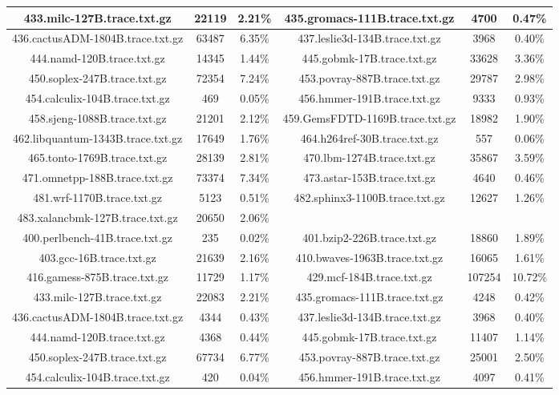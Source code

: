 \begin{table}[H]
\begin{tabular}{|c|c|c|c|c|c|}
433.milc-127B.trace.txt.gz & 22119 & 2.21\% & 435.gromacs-111B.trace.txt.gz & 4700 & 0.47\% \\\hline
436.cactusADM-1804B.trace.txt.gz & 63487 & 6.35\% & 437.leslie3d-134B.trace.txt.gz & 3968 & 0.40\% \\\hline
444.namd-120B.trace.txt.gz & 14345 & 1.44\% & 445.gobmk-17B.trace.txt.gz & 33628 & 3.36\% \\\hline
450.soplex-247B.trace.txt.gz & 72354 & 7.24\% & 453.povray-887B.trace.txt.gz & 29787 & 2.98\% \\\hline
454.calculix-104B.trace.txt.gz & 469 & 0.05\% & 456.hmmer-191B.trace.txt.gz & 9333 & 0.93\% \\\hline
458.sjeng-1088B.trace.txt.gz & 21201 & 2.12\% & 459.GemsFDTD-1169B.trace.txt.gz & 18982 & 1.90\% \\\hline
462.libquantum-1343B.trace.txt.gz & 17649 & 1.76\% & 464.h264ref-30B.trace.txt.gz & 557 & 0.06\% \\\hline
465.tonto-1769B.trace.txt.gz & 28139 & 2.81\% & 470.lbm-1274B.trace.txt.gz & 35867 & 3.59\% \\\hline
471.omnetpp-188B.trace.txt.gz & 73374 & 7.34\% & 473.astar-153B.trace.txt.gz & 4640 & 0.46\% \\\hline
481.wrf-1170B.trace.txt.gz & 5123 & 0.51\% & 482.sphinx3-1100B.trace.txt.gz & 12627 & 1.26\% \\\hline
483.xalancbmk-127B.trace.txt.gz & 20650 & 2.06\% & & & &  \\\hline
400.perlbench-41B.trace.txt.gz & 235 & 0.02\% & 401.bzip2-226B.trace.txt.gz & 18860 & 1.89\% \\\hline
403.gcc-16B.trace.txt.gz & 21639 & 2.16\% & 410.bwaves-1963B.trace.txt.gz & 16065 & 1.61\% \\\hline
416.gamess-875B.trace.txt.gz & 11729 & 1.17\% & 429.mcf-184B.trace.txt.gz & 107254 & 10.72\% \\\hline
433.milc-127B.trace.txt.gz & 22083 & 2.21\% & 435.gromacs-111B.trace.txt.gz & 4248 & 0.42\% \\\hline
436.cactusADM-1804B.trace.txt.gz & 4344 & 0.43\% & 437.leslie3d-134B.trace.txt.gz & 3968 & 0.40\% \\\hline
444.namd-120B.trace.txt.gz & 4368 & 0.44\% & 445.gobmk-17B.trace.txt.gz & 11407 & 1.14\% \\\hline
450.soplex-247B.trace.txt.gz & 67734 & 6.77\% & 453.povray-887B.trace.txt.gz & 25001 & 2.50\% \\\hline
454.calculix-104B.trace.txt.gz & 420 & 0.04\% & 456.hmmer-191B.trace.txt.gz & 4097 & 0.41\% \\\hline

\end{tabular}
\end{table}

